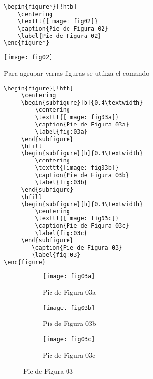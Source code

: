 \documentclass[12pt]{difu100cia} %
\begin{document}
\begin{lstlisting}[language=bash]
\begin{figure*}[!htb]
	\centering
	\texttt{[image: fig02]}
	\caption{Pie de Figura 02}
	\label{Pie de Figura 02}
\end{figure*}
\end{lstlisting}

\begin{figure*}[!htb]
	\centering
	\texttt{[image: fig02]}
	\caption{Pie de Figura 02}
	\label{Pie de Figura 02}
\end{figure*}

Para agrupar varias figuras se utiliza el comando 

\begin{lstlisting}[language=bash]
\begin{figure}[!htb]
     \centering
     \begin{subfigure}[b]{0.4\textwidth}
         \centering
         \texttt{[image: fig03a]}
         \caption{Pie de Figura 03a}
         \label{fig:03a}
     \end{subfigure}
     \hfill
     \begin{subfigure}[b]{0.4\textwidth}
         \centering
         \texttt{[image: fig03b]}
         \caption{Pie de Figura 03b}
         \label{fig:03b}
     \end{subfigure}
     \hfill
     \begin{subfigure}[b]{0.4\textwidth}
         \centering
         \texttt{[image: fig03c]}
         \caption{Pie de Figura 03c}
         \label{fig:03c}
     \end{subfigure}
        \caption{Pie de Figura 03}
        \label{fig:03}
\end{figure}
\end{lstlisting}

\begin{figure}[htb!]
    \centering
    \begin{subfigure}[b]{0.4\textwidth}
        \centering
        \texttt{[image: fig03a]}
        \caption{Pie de Figura 03a}
        \label{fig:03a}
    \end{subfigure}
    \hfill
    \begin{subfigure}[b]{0.4\textwidth}
        \centering
        \texttt{[image: fig03b]}
        \caption{Pie de Figura 03b}
        \label{fig:03b}
    \end{subfigure}
    \hfill
    \begin{subfigure}[b]{0.4\textwidth}
        \centering
        \texttt{[image: fig03c]}
        \caption{Pie de Figura 03c}
        \label{fig:03c}
    \end{subfigure}
       \caption{Pie de Figura 03}
       \label{fig:03}
\end{figure}
\end{document}
